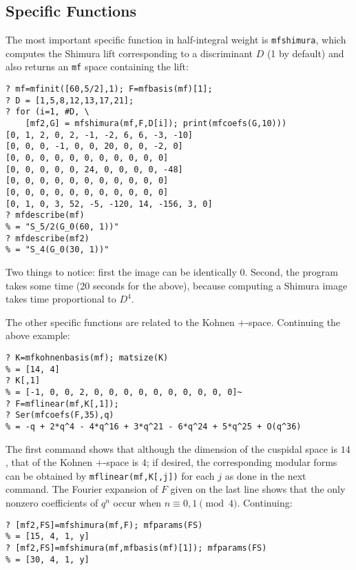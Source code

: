 \documentclass[11pt]{article}
\def\kbd#1{{\tt #1}}
\begin{document}
\subsection{Specific Functions}

The most important specific function in half-integral weight is
\kbd{mfshimura}, which computes the Shimura lift corresponding to a
discriminant $D$ (1 by default) and also returns an \kbd{mf} space
containing the lift:

\begin{verbatim}
? mf=mfinit([60,5/2],1); F=mfbasis(mf)[1];
? D = [1,5,8,12,13,17,21];
? for (i=1, #D, \
    [mf2,G] = mfshimura(mf,F,D[i]); print(mfcoefs(G,10)))
[0, 1, 2, 0, 2, -1, -2, 6, 6, -3, -10]
[0, 0, 0, -1, 0, 0, 20, 0, 0, -2, 0]
[0, 0, 0, 0, 0, 0, 0, 0, 0, 0, 0]
[0, 0, 0, 0, 0, 24, 0, 0, 0, 0, -48]
[0, 0, 0, 0, 0, 0, 0, 0, 0, 0, 0]
[0, 0, 0, 0, 0, 0, 0, 0, 0, 0, 0]
[0, 1, 0, 3, 52, -5, -120, 14, -156, 3, 0]
? mfdescribe(mf)
% = "S_5/2(G_0(60, 1))"
? mfdescribe(mf2)
% = "S_4(G_0(30, 1))"
\end{verbatim}

Two things to notice: first the image can be identically $0$.
Second, the program takes some time (20 seconds for the above), because
computing a Shimura image takes time proportional to $D^4$.

\smallskip

The other specific functions are related to the Kohnen $+$-space. Continuing
the above example:

\begin{verbatim}
? K=mfkohnenbasis(mf); matsize(K)
% = [14, 4]
? K[,1]
% = [-1, 0, 0, 2, 0, 0, 0, 0, 0, 0, 0, 0, 0, 0]~
? F=mflinear(mf,K[,1]);
? Ser(mfcoefs(F,35),q)
% = -q + 2*q^4 - 4*q^16 + 3*q^21 - 6*q^24 + 5*q^25 + O(q^36)
\end{verbatim}

The first command shows that although the dimension of the cuspidal space
is $14$, that of the Kohnen $+$-space is $4$; if desired, the corresponding
modular forms can be obtained by \kbd{mflinear(mf,K[,j])} for each $j$ as
done in the next command. The Fourier expansion of $F$ given
on the last line shows that the only nonzero coefficients of $q^n$ occur
when $n\equiv0,1\pmod4$. Continuing:

\begin{verbatim}
? [mf2,FS]=mfshimura(mf,F); mfparams(FS)
% = [15, 4, 1, y]
? [mf2,FS]=mfshimura(mf,mfbasis(mf)[1]); mfparams(FS)
% = [30, 4, 1, y]
\end{verbatim}
\end{document}
